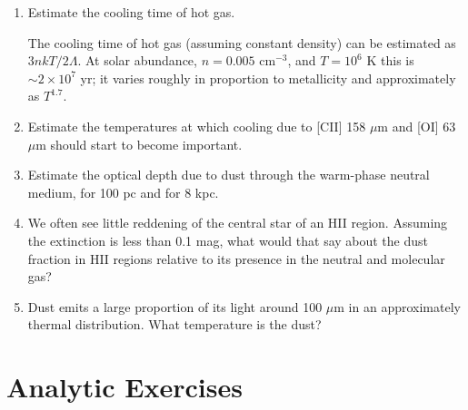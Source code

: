 \begin{enumerate} 
\item Estimate the cooling time of hot gas.
\begin{answer}
The cooling time of hot gas (assuming constant density) can be
estimated as $3nkT / 2 \Lambda$. At solar abundance, $n=0.005$
cm$^{-3}$, and $T=10^6$ K this is $\sim 2 \times 10^7$ yr; it varies
roughly in proportion to metallicity and approximately as $T^{1.7}$.
\end{answer}
\item Estimate the temperatures at which cooling due to [CII]
158 $\mu$m and [OI] 63 $\mu$m should start to become important.
\item Estimate the optical depth due to dust through the warm-phase neutral
medium, for 100 pc and for 8 kpc.
\item We often see little reddening of the central star of an HII
region. Assuming the extinction is less than 0.1 mag, what would that
say about the dust fraction in HII regions relative to its presence in
the neutral and molecular gas?
\item Dust emits a large proportion of its light around 100 $\mu$m in
an approximately thermal distribution. What temperature is the dust?
\end{enumerate}   

\section{Analytic Exercises}

